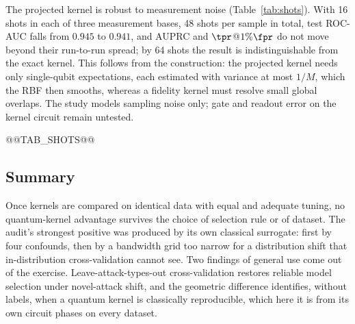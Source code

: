 The projected kernel is robust to measurement noise (Table~\ref{tab:shots}). With 16 shots in each of three
measurement bases, 48 shots per sample in total, test ROC-AUC falls from $0.945$ to $0.941$, and AUPRC and
$\tpr$@$1\%\fpr$ do not move beyond their run-to-run spread; by 64 shots the result is indistinguishable
from the exact kernel. This follows from the construction: the projected kernel needs only single-qubit
expectations, each estimated with variance at most $1/M$, which the RBF then smooths, whereas a fidelity
kernel must resolve small global overlaps. The study models sampling noise only; gate and readout error on
the kernel circuit remain untested.

@@TAB_SHOTS@@

\subsection{Summary}\label{sec:ksum}
Once kernels are compared on identical data with equal and adequate tuning, no quantum-kernel advantage
survives the choice of selection rule or of dataset. The audit's strongest positive was produced by its
own classical surrogate: first by four confounds, then by a bandwidth grid too narrow for a distribution
shift that in-distribution cross-validation cannot see. Two findings of general use come out of the
exercise. Leave-attack-types-out cross-validation restores reliable model selection under novel-attack
shift, and the geometric difference identifies, without labels, when a quantum kernel is classically
reproducible, which here it is from its own circuit phases on every dataset.
